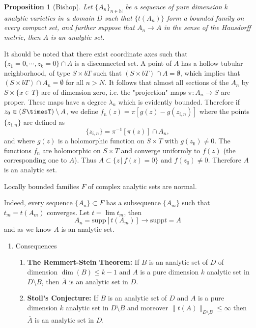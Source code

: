 \documentclass[12pt,twoside,a4paper]{report}
\newtheorem{prop}[theorem]{Proposition}
\begin{document}
\begin{prop}[Bishop]
Let $\{A_n\}_{n\in\mathbb{N}}$ be a sequence of pure dimension $k$ analytic varieties in a domain $D$ such that $\{t(A_n)\}$ form a bounded family on every compact set, and further suppose that $A_n\rightarrow A$ in the sense of the Hausdorff metric, then $A$ is an analytic set.
\end{prop}

\obs It should be noted that there exist coordinate axes such that $\{z_1=0,\cdots,z_k=0\}\cap A$ is a disconnected set. A point of $A$ has a hollow tubular neighborhood, of type $S\times bT$ such that $(S\times bT)\cap A=\emptyset$, which implies that $(S\times bT)\cap A_n=\emptyset$ for all $n>N$. It follows that almost all sections of the $A_n$ by $S\times\{x\in T\}$ are of dimension zero, i.e. the "projection" maps $\pi:A_n\rightarrow S$ are proper. These maps have a degree $\lambda_n$ which is evidently bounded. Therefore if $z_0\in(S\timesT)\setminus A$, we define $f_n(z)=\pi[g(z)-g(z_{i,n})]$ where the points $\{z_{i,n}\}$ are defined as
\[
\{z_{i,n}\}=\pi^{-1}[\pi(z)]\cap A_n,
\]
and where $g(z)$ is a holomorphic function on $S\times T$ with $g(z_0)\neq0$. The functions $f_n$ are holomorphic on $S\times T$ and converge uniformly to $f(z)$ (the corresponding one to $A$). Thus $A\subset\{z\,|\,f(z)=0\}$ and $f(z_0)\neq0$. Therefore $A$ is an analytic set.

\begin{teorema}
Locally bounded families $F$ of complex analytic sets are normal.
\end{teorema}

Indeed, every sequence $\{A_n\}\subset F$ has a subsequence $\{A_m\}$ such that $t_m=t(A_m)$ converges. Let $t=\lim t_m$, then
\[
    A_n=\mathrm{supp}[t(A_m)]\rightarrow\mathrm{supp}t=A
\]
and as we know $A$ is an analytic set.

\begin{enumerate}
\item Consequences
\label{sec:org6dba31e}
\begin{enumerate}
\item \textbf{The Remmert-Stein Theorem:} If $B$ is an analytic set of $D$ of dimension $\dim(B)\leq k-1$ and $A$ is a pure dimension $k$ analytic set in $D\setminus B$, then $\overline{A}$ is an analytic set in $D$.
\item \textbf{Stoll's Conjecture:} If $B$ is an analytic set of $D$ and $A$ is a pure dimension $k$ analytic set in $D\setminus B$ and moreover $\|t(A)\|_{D\setminus B}\leq\infty$ then $\overline{A}$ is an analytic set in $D$.
\end{enumerate}
\end{enumerate}
\end{document}
